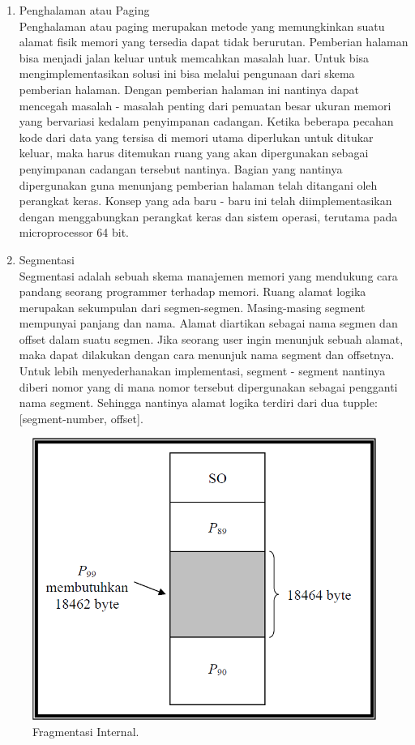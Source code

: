 \begin{enumerate}
\item Penghalaman atau Paging \\
Penghalaman atau paging  merupakan metode yang memungkinkan suatu alamat fisik memori yang tersedia dapat tidak berurutan. Pemberian halaman bisa menjadi jalan keluar untuk memcahkan masalah luar. Untuk bisa mengimplementasikan solusi ini bisa melalui pengunaan dari skema pemberian halaman. Dengan pemberian halaman ini nantinya dapat mencegah masalah - masalah penting dari pemuatan besar ukuran memori yang bervariasi kedalam penyimpanan cadangan. Ketika beberapa pecahan kode dari data yang tersisa di memori utama diperlukan untuk ditukar keluar, maka harus ditemukan ruang yang akan dipergunakan sebagai penyimpanan cadangan tersebut nantinya. Bagian yang nantinya dipergunakan guna menunjang pemberian halaman telah ditangani oleh perangkat keras. Konsep yang ada baru - baru ini telah diimplementasikan dengan menggabungkan perangkat keras dan sistem operasi, terutama pada microprocessor 64 bit.


\item Segmentasi\\
Segmentasi adalah sebuah skema manajemen memori yang mendukung cara pandang seorang programmer terhadap memori. Ruang alamat logika merupakan sekumpulan dari segmen-segmen. Masing-masing segment mempunyai panjang dan nama. Alamat diartikan sebagai nama segmen dan offset dalam suatu segmen. Jika seorang user ingin menunjuk sebuah alamat, maka dapat dilakukan dengan cara menunjuk nama segment dan offsetnya. Untuk lebih menyederhanakan implementasi, segment - segment nantinya diberi nomor yang di mana nomor tersebut dipergunakan sebagai pengganti nama segment. Sehingga nantinya alamat logika terdiri dari dua tupple: [segment-number, offset].
\end{enumerate}

\begin{figure}[ht]
\centerline{\includegraphics[width=1\textwidth]{figures/fragmentasi_internal.png}}
\caption{Fragmentasi Internal.}
\label{fragmentasiinternal}
\end{figure}

